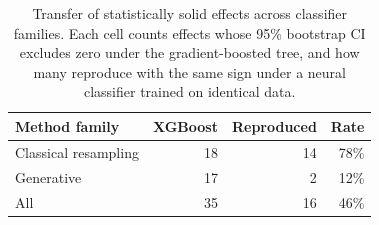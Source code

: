 \begin{table}[t]
\centering
\caption{Transfer of statistically solid effects across classifier families. Each cell counts effects whose 95\% bootstrap CI excludes zero under the gradient-boosted tree, and how many reproduce with the same sign under a neural classifier trained on identical data.}
\label{tab:robustness}
\begin{tabular}{lrrr}
\toprule
Method family & XGBoost & Reproduced & Rate \\
\midrule
Classical resampling & 18 & 14 & 78\% \\
Generative & 17 & 2 & 12\% \\
\midrule
All & 35 & 16 & 46\% \\
\bottomrule
\end{tabular}
\end{table}
